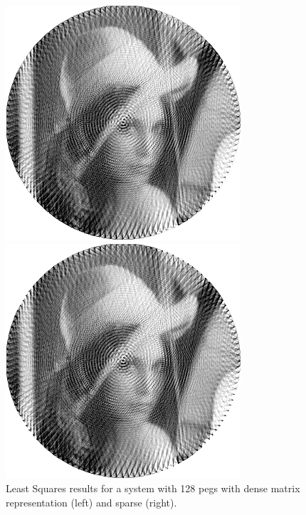\begin{figure}[H]
    \centering
    \begin{minipage}{0.2\linewidth}
        \centering
        \includegraphics[width=\linewidth]{images/ls/ls_dense.png}
    \end{minipage}
    \begin{minipage}{0.2\linewidth}
        \centering
        \includegraphics[width=\linewidth]{images/ls/ls_sparse.png}
    \end{minipage}
    \caption{Least Squares results for a system with 128 pegs with dense matrix representation (left) and sparse (right).}
    \label{fig:ls_output}
\end{figure}

